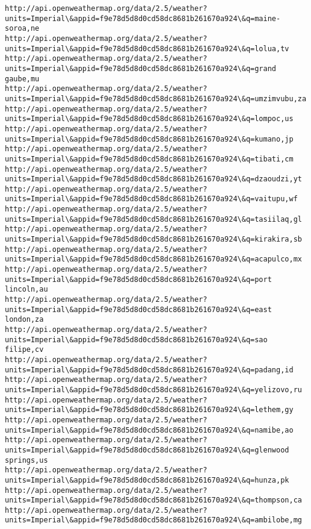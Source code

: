 \documentclass[11pt]{article}
\begin{document}
\begin{Verbatim}[commandchars=\\\{\}]
http://api.openweathermap.org/data/2.5/weather?units=Imperial\&appid=f9e78d5d8d0cd58dc8681b261670a924\&q=maine-soroa,ne
http://api.openweathermap.org/data/2.5/weather?units=Imperial\&appid=f9e78d5d8d0cd58dc8681b261670a924\&q=lolua,tv
http://api.openweathermap.org/data/2.5/weather?units=Imperial\&appid=f9e78d5d8d0cd58dc8681b261670a924\&q=grand gaube,mu
http://api.openweathermap.org/data/2.5/weather?units=Imperial\&appid=f9e78d5d8d0cd58dc8681b261670a924\&q=umzimvubu,za
http://api.openweathermap.org/data/2.5/weather?units=Imperial\&appid=f9e78d5d8d0cd58dc8681b261670a924\&q=lompoc,us
http://api.openweathermap.org/data/2.5/weather?units=Imperial\&appid=f9e78d5d8d0cd58dc8681b261670a924\&q=kumano,jp
http://api.openweathermap.org/data/2.5/weather?units=Imperial\&appid=f9e78d5d8d0cd58dc8681b261670a924\&q=tibati,cm
http://api.openweathermap.org/data/2.5/weather?units=Imperial\&appid=f9e78d5d8d0cd58dc8681b261670a924\&q=dzaoudzi,yt
http://api.openweathermap.org/data/2.5/weather?units=Imperial\&appid=f9e78d5d8d0cd58dc8681b261670a924\&q=vaitupu,wf
http://api.openweathermap.org/data/2.5/weather?units=Imperial\&appid=f9e78d5d8d0cd58dc8681b261670a924\&q=tasiilaq,gl
http://api.openweathermap.org/data/2.5/weather?units=Imperial\&appid=f9e78d5d8d0cd58dc8681b261670a924\&q=kirakira,sb
http://api.openweathermap.org/data/2.5/weather?units=Imperial\&appid=f9e78d5d8d0cd58dc8681b261670a924\&q=acapulco,mx
http://api.openweathermap.org/data/2.5/weather?units=Imperial\&appid=f9e78d5d8d0cd58dc8681b261670a924\&q=port lincoln,au
http://api.openweathermap.org/data/2.5/weather?units=Imperial\&appid=f9e78d5d8d0cd58dc8681b261670a924\&q=east london,za
http://api.openweathermap.org/data/2.5/weather?units=Imperial\&appid=f9e78d5d8d0cd58dc8681b261670a924\&q=sao filipe,cv
http://api.openweathermap.org/data/2.5/weather?units=Imperial\&appid=f9e78d5d8d0cd58dc8681b261670a924\&q=padang,id
http://api.openweathermap.org/data/2.5/weather?units=Imperial\&appid=f9e78d5d8d0cd58dc8681b261670a924\&q=yelizovo,ru
http://api.openweathermap.org/data/2.5/weather?units=Imperial\&appid=f9e78d5d8d0cd58dc8681b261670a924\&q=lethem,gy
http://api.openweathermap.org/data/2.5/weather?units=Imperial\&appid=f9e78d5d8d0cd58dc8681b261670a924\&q=namibe,ao
http://api.openweathermap.org/data/2.5/weather?units=Imperial\&appid=f9e78d5d8d0cd58dc8681b261670a924\&q=glenwood springs,us
http://api.openweathermap.org/data/2.5/weather?units=Imperial\&appid=f9e78d5d8d0cd58dc8681b261670a924\&q=hunza,pk
http://api.openweathermap.org/data/2.5/weather?units=Imperial\&appid=f9e78d5d8d0cd58dc8681b261670a924\&q=thompson,ca
http://api.openweathermap.org/data/2.5/weather?units=Imperial\&appid=f9e78d5d8d0cd58dc8681b261670a924\&q=ambilobe,mg

\end{Verbatim}
\end{document}
